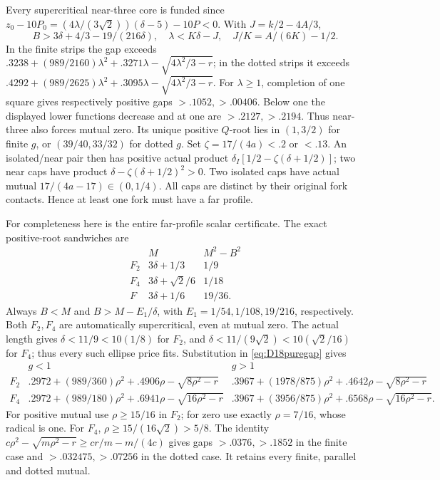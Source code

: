 \documentclass[11pt]{article}
\theoremstyle{definition}
\theoremstyle{remark}
\begin{document}
Every supercritical near-three core is funded since
\(z_0-10P_0=(4\lambda/(3\sqrt2))(\delta-5)-10P<0\).
With \(J=k/2-4A/3\),
\[
 B>3\delta+4/3-19/(216\delta),\quad
 \lambda<K\delta-J,\quad J/K=A/(6K)-1/2 .
\]
In the finite strips the gap exceeds
\(.3238+(989/2160)\lambda^2+.3271\lambda
-\sqrt{4\lambda^2/3-r}\);
in the dotted strips it exceeds
\(.4292+(989/2625)\lambda^2+.3095\lambda
-\sqrt{4\lambda^2/3-r}\).
For \(\lambda\geq1\), completion of one square gives respectively
positive gaps \(>.1052,>.00406\).
Below one the displayed lower functions decrease and at one are
\(>.2127,>.2194\).
Thus near-three also forces mutual zero.
Its unique positive \(Q\)-root lies in \((1,3/2)\) for finite
\(g\), or \((39/40,33/32)\) for dotted \(g\).
Set \(\zeta=17/(4a)<.2\) or \(<.13\).
An isolated/near pair then has positive actual product
\(\delta_I[1/2-\zeta(\delta+1/2)]\);
two near caps have product
\(\delta-\zeta(\delta+1/2)^2>0\).
Two isolated caps have actual mutual
\(17/(4a-17)\in(0,1/4)\).
All caps are distinct by their original fork contacts.
Hence at least one fork must have a far profile.

For completeness here is the entire far-profile scalar certificate.
The exact positive-root sandwiches are
\[
\begin{array}{c|c|c}
 &M&M^2-B^2\\ \hline
F_2&3\delta+1/3&1/9\\
F_4&3\delta+\sqrt2/6&1/18\\
F&3\delta+1/6&19/36 .
\end{array}
\]
Always \(B<M\) and
\(B>M-E_1/\delta\), with
\(E_1=1/54,1/108,19/216\), respectively.
Both \(F_2,F_4\) are automatically supercritical, even at mutual zero.
The actual length gives
\(\delta<11/9<10(1/8)\) for \(F_2\), and
\(\delta<11/(9\sqrt2)<10(\sqrt2/16)\) for \(F_4\);
thus every such ellipse price fits.
Substitution in \eqref{eq:D18puregap} gives
\[
\begin{array}{c|c|c}
 &g<1&g>1\\ \hline
F_2&
 .2972+(989/360)\rho^2+.4906\rho-\sqrt{8\rho^2-r}&
 .3967+(1978/875)\rho^2+.4642\rho-\sqrt{8\rho^2-r}\\
F_4&
 .2972+(989/180)\rho^2+.6941\rho-\sqrt{16\rho^2-r}&
 .3967+(3956/875)\rho^2+.6568\rho-\sqrt{16\rho^2-r}.
\end{array}
\]
For positive mutual use \(\rho\geq15/16\) in \(F_2\);
for zero use exactly \(\rho=7/16\), whose radical is one.
For \(F_4\), \(\rho\geq15/(16\sqrt2)>5/8\).
The identity
\(c\rho^2-\sqrt{m\rho^2-r}\geq cr/m-m/(4c)\)
gives gaps \(>.0376,>.1852\) in the finite case and
\(>.032475,>.07256\) in the dotted case.
It retains every finite, parallel and dotted mutual.
\end{document}
